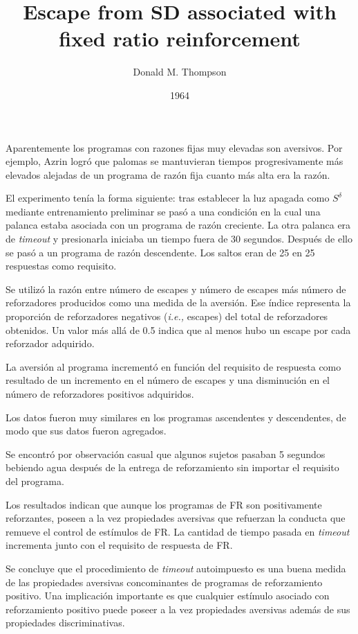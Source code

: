 \documentclass[a4paper,12pt]{article}
\title{Escape from SD associated with fixed ratio reinforcement}
\author{Donald M. Thompson}
\date{1964}
\begin{document}
{\scshape\bfseries \maketitle}

Aparentemente los programas con razones fijas muy elevadas son aversivos. Por ejemplo, Azrin logró que palomas se mantuvieran tiempos progresivamente más elevados alejadas de un programa de razón fija cuanto más alta era la razón.

El experimento tenía la forma siguiente: tras establecer la luz apagada como $S^{\delta}$ mediante entrenamiento preliminar se pasó a una condición en la cual una palanca estaba asociada con un programa de razón creciente. La otra palanca era de {\itshape timeout} y presionarla iniciaba un tiempo fuera de 30 segundos. Después de ello se pasó a un programa de razón descendente. Los saltos eran de 25 en 25 respuestas como requisito.

Se utilizó la razón entre número de escapes y número de escapes más número de reforzadores producidos como una medida de la aversión. Ese índice representa la proporción de reforzadores negativos ({\itshape i.e.,} escapes) del total de reforzadores obtenidos. Un valor más allá de 0.5 indica que al menos hubo un escape por cada reforzador adquirido.

La aversión al programa incrementó en función del requisito de respuesta como resultado de un incremento en el número de escapes y una disminución en el número de reforzadores positivos adquiridos.

Los datos fueron muy similares en los programas ascendentes y descendentes, de modo que sus datos fueron agregados.

Se encontró por observación casual que algunos sujetos pasaban 5 segundos bebiendo agua después de la entrega de reforzamiento sin importar el requisito del programa.

Los resultados indican que aunque los programas de FR son positivamente reforzantes, poseen a la vez propiedades aversivas que refuerzan la conducta que remueve el control de estímulos de FR. La cantidad de tiempo pasada en {\itshape timeout} incrementa junto con el requisito de respuesta de FR.

Se concluye que el procedimiento de {\itshape timeout} autoimpuesto es una buena medida de las propiedades aversivas concominantes de programas de reforzamiento positivo. Una implicación importante es que cualquier estímulo asociado con reforzamiento positivo puede poseer a la vez propiedades aversivas además de sus propiedades discriminativas.
\end{document}
